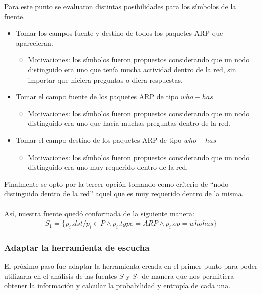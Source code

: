 Para este punto se evaluaron distintas posibilidades para los s\'imbolos de la fuente.\\
\begin{itemize}
\item Tomar los campos fuente y destino de todos los paquetes ARP que aparecieran.
\begin{itemize}
\item Motivaciones: los s\'imbolos fueron propuestos considerando que un nodo distinguido era uno que ten\'ia mucha actividad dentro de la red, sin importar que hiciera preguntas o diera respuestas.
\end{itemize}
\item Tomar el campo fuente de los paquetes ARP de tipo $who-has$
\begin{itemize}
\item Motivaciones: los s\'imbolos fueron propuestos considerando que un nodo distinguido era uno que hac\'ia muchas preguntas dentro de la red.
\end{itemize}
\item Tomar el campo destino de los paquetes ARP de tipo $who-has$
\begin{itemize}
\item Motivaciones: los s\'imbolos fueron propuestos considerando que un nodo distinguido era uno muy requerido dentro de la red.
\end{itemize}
\end{itemize}
\vspace{0.5cm}  

Finalmente se opto por la tercer opci\'on tomando como cr\'iterio de ``nodo distinguido dentro de la red'' aquel que es muy requerido dentro de la misma.\\\\

As\'i, nuestra fuente qued\'o conformada de la siguiente manera:\\
\begin{gather*}
S_1 =  \{ p_{i}.dst / p_{i} \in P \wedge  p_{i}.type = ARP \wedge p_{i}.op = whohas \}
\end{gather*}
\vspace{0.5cm}

\subsubsection{Adaptar la herramienta de escucha}

El pr\'oximo paso fue adaptar la herramienta creada en el primer punto para poder utilizarla en el an\'alisis de las fuentes $S$ y $S_1$ de manera que nos permitiera obtener la informaci\'on y calcular la probabilidad y entrop\'ia de cada una.\\


